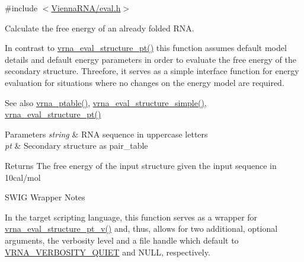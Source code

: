{\ttfamily \#include $<$\hyperlink{eval_8h}{Vienna\+R\+N\+A/eval.\+h}$>$}



Calculate the free energy of an already folded R\+NA. 

In contrast to \hyperlink{group__eval_gadbd09372ddfd7a450bbd590c96a6bfe4}{vrna\+\_\+eval\+\_\+structure\+\_\+pt()} this function assumes default model details and default energy parameters in order to evaluate the free energy of the secondary structure. Threefore, it serves as a simple interface function for energy evaluation for situations where no changes on the energy model are required.

\begin{DoxySeeAlso}{See also}
\hyperlink{group__struct__utils__pair__table_gae829fb8bb7f694c12a9c0bbc34c77c60}{vrna\+\_\+ptable()}, \hyperlink{group__eval_ga7e5273464b775d4130245681312c1369}{vrna\+\_\+eval\+\_\+structure\+\_\+simple()}, \hyperlink{group__eval_gadbd09372ddfd7a450bbd590c96a6bfe4}{vrna\+\_\+eval\+\_\+structure\+\_\+pt()}
\end{DoxySeeAlso}

\begin{DoxyParams}{Parameters}
{\em string} & R\+NA sequence in uppercase letters \\
\hline
{\em pt} & Secondary structure as pair\+\_\+table \\
\hline
\end{DoxyParams}
\begin{DoxyReturn}{Returns}
The free energy of the input structure given the input sequence in 10cal/mol
\end{DoxyReturn}
\begin{DoxyRefDesc}{S\+W\+I\+G Wrapper Notes}
\item[\hyperlink{wrappers__wrappers000059}{S\+W\+I\+G Wrapper Notes}]In the target scripting language, this function serves as a wrapper for \hyperlink{group__eval_ga2c6533ba0afe4c88d335d8f1e0e2a48e}{vrna\+\_\+eval\+\_\+structure\+\_\+pt\+\_\+v()} and, thus, allows for two additional, optional arguments, the verbosity level and a file handle which default to \hyperlink{group__eval_gaf4afe19780b61b4962c613bde324128b}{V\+R\+N\+A\+\_\+\+V\+E\+R\+B\+O\+S\+I\+T\+Y\+\_\+\+Q\+U\+I\+ET} and N\+U\+LL, respectively. \end{DoxyRefDesc}
\mbox{\label{group__eval_ga76e152ee9a02be23da14cdddf52b4e44}} 
